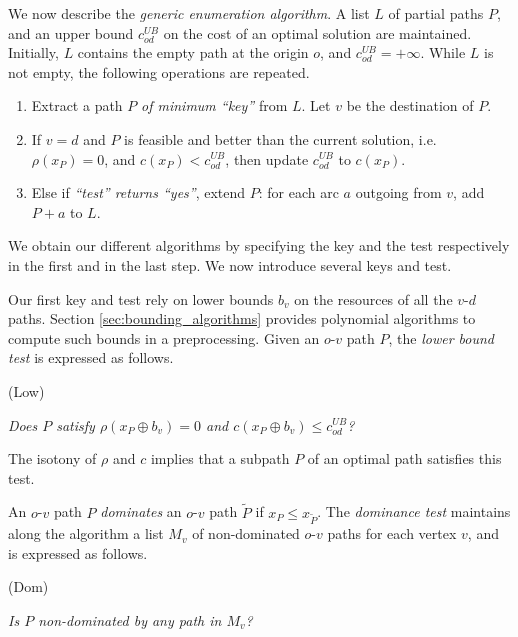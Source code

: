 \documentclass[11pt]{amsart}
\theoremstyle{plain}
\theoremstyle{remark}
\newcommand{\rplus}{\oplus}
\newcommand{\rleq}{\leqslant}
\newcommand{\rcost}{c}
\newcommand{\rmeas}{\rho}
\newcommand{\re}{x}
\begin{document}
We now describe the \emph{generic enumeration algorithm}. A list $L$ of partial paths $P$, and an upper bound $c_{od}^{UB}$ on the cost of an optimal solution are maintained. Initially, $L$ contains the empty path at the origin $o$, and $c_{od}^{UB} = +\infty$. While $L$ is not empty, the following operations are repeated.

\begin{enumerate}
	\item Extract a path $P$ \emph{of minimum ``key''} from $L$. Let $v$ be the destination of $P$. \label{step:key}
	\item If $v = d$ and $P$ is feasible and better than the current solution, i.e.~$\rmeas(\re_{P}) = 0$, and $\rcost(\re_{P}) < c_{od}^{UB}$, then update $c_{od}^{UB}$ to $\rcost(\re_{P})$.
	\item Else if \emph{``test'' returns ``yes''}, extend $P$: for each arc $a$ outgoing from $v$, add $P+a$ to $L$. \label{step:test}
\end{enumerate}

We obtain our different algorithms by specifying the key and the test respectively in the first and in the last step. We now introduce several keys and test. 

Our first key and test rely on lower bounds $b_{v}$ on the resources of all the $v$-$d$ paths. Section \ref{sec:bounding_algorithms} provides polynomial algorithms to compute such bounds in a preprocessing. Given an $o$-$v$ path $P$, the \emph{lower bound test} is expressed as follows.


\smallskip
	(Low) \begin{minipage}{\dimexpr\textwidth-2cm} \emph{Does $P$ satisfy $\rmeas(\re_{P}\rplus b_{v}) = 0$ and $\rcost(\re_{P}\rplus b_{v}) \rleq c_{od}^{UB}$?}
\end{minipage}
\smallskip

\noindent The isotony of $\rmeas$ and $\rcost$ implies that a subpath $P$ of an optimal path satisfies this test. 

An $o$-$v$ path $P$ \emph{dominates} an $o$-$v$ path $\tilde P$ if  $\re_{P} \rleq \re_{\tilde P}$. The \emph{dominance test} maintains along the algorithm a list $M_{v}$ of non-dominated $o$-$v$ paths for each vertex $v$, and is expressed as follows.

\smallskip
	(Dom) \begin{minipage}{\dimexpr\textwidth-2cm} \emph{Is $P$ non-dominated by any path in $M_{v}$?}
\end{minipage}
\smallskip
\end{document}
